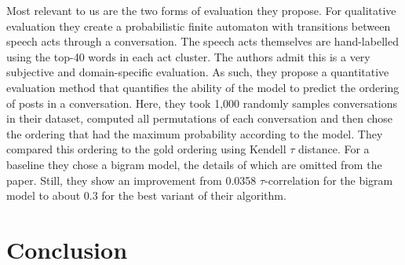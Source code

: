\documentclass{article}
\begin{document}
Most relevant to us are the two forms of evaluation they propose. For
qualitative evaluation they create a probabilistic finite automaton with
transitions between speech acts through a conversation. The speech acts
themselves are hand-labelled using the top-40 words in each act cluster. The 
authors admit this is a very subjective and domain-specific evaluation. As such,
they propose a quantitative evaluation method that quantifies the ability of
the model to predict the ordering of posts in a conversation. Here, they took
1,000 randomly samples conversations in their dataset, computed all permutations
of each conversation and then chose the ordering that had the maximum
probability according to the model. They compared this ordering to the gold
ordering using Kendell $\tau$ distance. For a baseline they chose a bigram
model, the details of which are omitted from the paper. Still, they show an
improvement from 0.0358 $\tau$-correlation for the bigram model to about 0.3 for
the best variant of their algorithm.





\section{Conclusion}

{}

\end{document}
